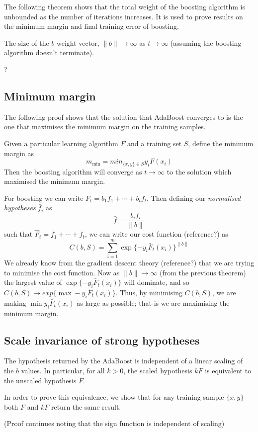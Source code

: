 The following theorem shows that the total weight of the boosting
algorithm is unbounded as the number of iterations increases.  It is
used to prove results on the minimum margin and final training error
of boosting.

\begin{theorem}
The size of the $b$ weight vector, $\|b\| \rightarrow \infty$
as $t \rightarrow \infty$ (assuming the boosting algorithm doesn't
terminate).

\proof ?
\end{theorem}


\subsection{Minimum margin}

The following proof shows that the solution that AdaBoost converges to
is the one that maximises the minimum margin on the training samples.

\begin{theorem}
Given a particular learning algorithm $F$ and a training
set $S$, define the minimum margin as
\[
m_{\min} = min_{\{x,y\} \in S} y_i F(x_i)
\]
Then the boosting algorithm will converge as $t \rightarrow \infty$ to
the solution which maximised the minimum margin.

\proof For boosting we can write $F_t = b_1 f_1 + \cdots + b_t f_t$.
Then defining our \emph{normalised hypotheses} $\bar{f}_i$ as
\[
\bar{f} = \frac{b_i f_i}{\|b\|}
\]
such that $\hat{F}_t = \bar{f}_1 + \cdots + \bar{f}_t$, we can write
our cost function (reference?) as 
\[
C(b, S) = \sum_{i=1}^{m} \exp\{-y_i \bar{F}_t(x_i)\}^{\|b\|}
\]
We already know from the gradient descent theory (reference?) that we
are trying to minimise the cost function.  Now as $\|b\| \rightarrow
\infty$ (from the previous theorem) the largest value of $\exp\{-y_i
\bar{F}_t(x_i)\}$ will dominate, and so $C(b, S) \rightarrow exp\{\max
-y_i \bar{F}_t(x_i)\}$.  Thus, by minimising $C(b, S)$, we are making
$\min y_i \bar{F}_t(x_i)$ as large as possible; that is we are
maximising the minimum margin.
\end{theorem}


\subsection{Scale invariance of strong hypotheses}
\begin{theorem}
The hypothesis returned by the AdaBoost is independent of a linear
scaling of the $b$ values.  In particular, for all $k > 0$, the
scaled hypothesis $kF$ is equivalent to the unscaled hypothesis $F$.

\proof In order to prove this equivalence, we show that for any
training sample $\{x, y\}$ both $F$ and $kF$ return the same result.

(Proof continues noting that the sign function is independent of
scaling)
\end{theorem}

